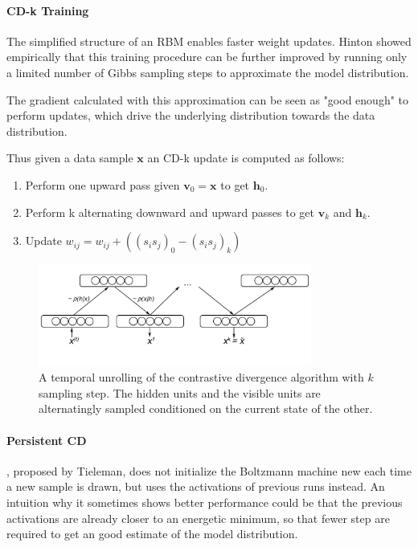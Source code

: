 \paragraph{CD-k Training}

The simplified structure of an RBM enables faster weight updates. 
Hinton showed empirically that this training procedure can be further improved by running only a limited number of Gibbs sampling steps to approximate the model distribution.

The gradient calculated with this approximation can be seen as "good enough" to perform updates, which drive the underlying distribution towards the data distribution.

Thus given a data sample $\textbf{x}$ an CD-k update is computed as follows:
\begin{enumerate}
\item Perform one upward pass given $\textbf{v}_0=\textbf{x}$ to get $\textbf{h}_0$.
\item Perform k alternating downward and upward passes to get $\textbf{v}_k$ and $\textbf{h}_k$.
\item Update $w_{ij} = w_{ij} + ( (s_i s_j)_0 - (s_i s_j)_k ) $ 
\end{enumerate} 

\begin{figure}
	\centering
    	\includegraphics[width=0.8\textwidth]{imgs/cd.png} 
    \caption{A temporal unrolling of the contrastive divergence algorithm with $k$ sampling step. The hidden units and the visible units are alternatingly sampled conditioned on the current state of the other.}
	\label{fig:cd}
\end{figure}

\paragraph{Persistent CD}

, proposed by Tieleman, does not initialize the Boltzmann machine new each time a new sample is drawn, but uses the activations of previous runs instead. An intuition why it sometimes shows better performance could be that the previous activations are already closer to an energetic minimum, so that fewer step are required to get an good estimate of the model distribution. 


